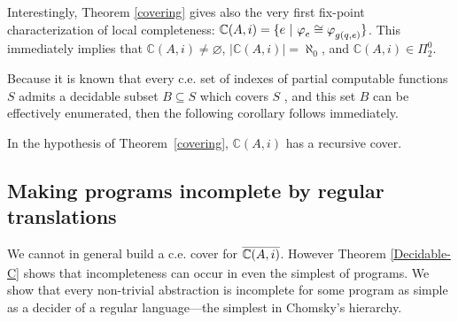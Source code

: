 \documentclass[runningheads]{llncs}
\def\ok#1{\mbox{\raisebox{0ex}[1ex][1ex]{$#1$}}}
\def\re{c.e.}
\def\bbbc{{\mathbb{C}}}
\newcommand{\pfunction}[3]{\ok{\varphi^{#2\, #3}_{#1}}}
\newcommand{\compl}[1]{\ok{\overline{#1}}}
\def\ok#1{\mbox{\raisebox{0ex}[1ex][1ex]{$#1$}}}
\def\cAA{\ensuremath{A}}
\newcommand{\sset}[2]{\{#1  ~|~ #2\}}
\begin{document}
Interestingly, Theorem \ref{covering} gives also the very first fix-point characterization of local completeness: $\bbbc(\cAA,i)=\sset{e}{\pfunction{e}{}{}\cong\pfunction{g(q,e)}{}{}}$. This immediately implies that $\bbbc(\cAA,i)\neq\varnothing$, $|\bbbc(\cAA,i)|=\aleph_0$, and  $\bbbc(\cAA,i)\in\Pi^0_2$. 

\smallskip

Because it is known that every {\re} set of indexes of partial computable functions $S$ admits a decidable subset $B\subseteq S$ which covers $S$ \cite{odifreddi}, and this set $B$ can be effectively enumerated, then the following corollary follows immediately.

\begin{corollary}
    In the hypothesis of Theorem~\ref{covering}, $\bbbc(\cAA,i)$ has a recursive cover.
\end{corollary}


\subsection{Making programs incomplete by regular translations}

We cannot in general build a {\re} cover for $\compl{\bbbc(\cAA,i)}$. However
Theorem \ref{Decidable-C} shows that 
incompleteness can occur in even the simplest of programs. We show that
every non-trivial abstraction is incomplete for some program as simple as a decider of a regular 
language---the simplest in Chomsky's hierarchy. 
\end{document}
